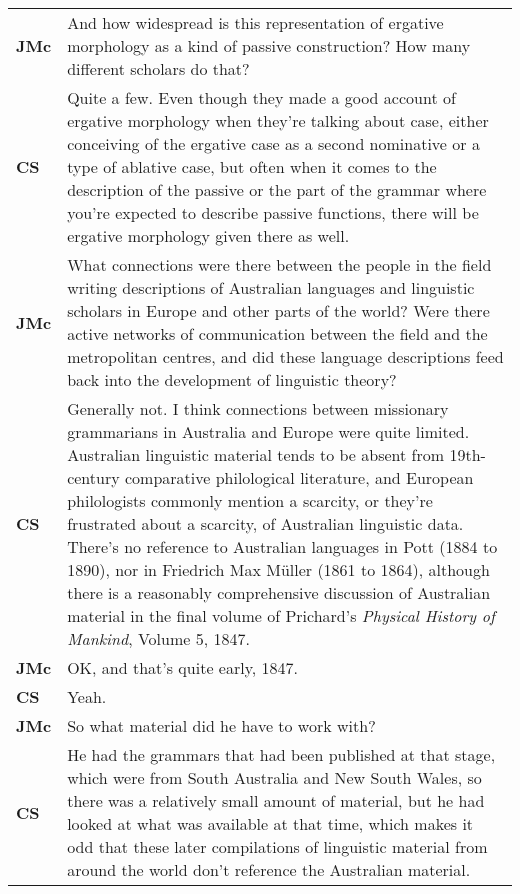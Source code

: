 \documentclass[12pt]{article}
\begin{document}
\begin{flushleft}
\begin{supertabular}{m{0.24415985in}m{5.89766in}}
\textbf{JMc}\newline
 &
And how widespread is this representation of ergative morphology as a kind of passive construction? How many different scholars do that?\\
\textbf{CS}\newline
 &
Quite a few. Even though they made a good account of ergative morphology when they’re talking about case, either conceiving of the ergative case as a second nominative or a type of ablative case, but often when it comes to the description of the passive or the part of the grammar where you’re expected to describe passive functions, there will be ergative morphology given there as well.\\
\textbf{JMc}\newline
 &
What connections were there between the people in the field writing descriptions of Australian languages and linguistic scholars in Europe and other parts of the world? Were there active networks of communication between the field and the metropolitan centres, and did these language descriptions feed back into the development of linguistic theory?\\
\textbf{CS}\newline
 &
Generally not. I think connections between missionary grammarians in Australia and Europe were quite limited. Australian linguistic material tends to be absent from 19th-century comparative philological literature, and European philologists commonly mention a scarcity, or they’re frustrated about a scarcity, of Australian linguistic data. There’s no reference to Australian languages in Pott (1884 to 1890), nor in Friedrich Max Müller (1861 to 1864), although there is a reasonably comprehensive discussion of Australian material in the final volume of Prichard’s \textit{Physical History of Mankind}, Volume 5, 1847.\\
\textbf{JMc}\newline
 &
OK, and that’s quite early, 1847.\\
\textbf{CS}\newline
 &
Yeah.\\
\textbf{JMc}\newline
 &
So what material did he have to work with?\\
\textbf{CS}\newline
 &
He had the grammars that had been published at that stage, which were from South Australia and New South Wales, so there was a relatively small amount of material, but he had looked at what was available at that time, which makes it odd that these later compilations of linguistic material from around the world don’t reference the Australian material.\\

\end{supertabular}
\end{flushleft}
\end{document}
